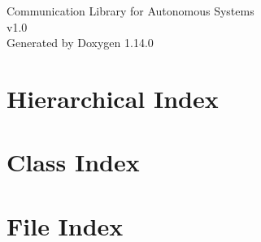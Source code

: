 \documentclass[twoside]{book}
\newcommand{\+}{\discretionary{\mbox{\scriptsize$\hookleftarrow$}}{}{}}
\newcommand{\clearemptydoublepage}{%
    \newpage{\pagestyle{empty}\cleardoublepage}%
  }
\begin{document}
  \raggedbottom
    \hypersetup{pageanchor=false,
                bookmarksnumbered=true,
                pdfencoding=unicode
               }
  \begin{titlepage}
  \vspace*{7cm}
  \begin{center}%
  {\Large Communication Library for Autonomous Systems}\\
  [1ex]\large v1.\+0 \\
  \vspace*{1cm}
  {\large Generated by Doxygen 1.14.0}\\
  \end{center}
  \end{titlepage}
  \clearemptydoublepage
  \tableofcontents
  \clearemptydoublepage
  \hypersetup{pageanchor=true}

\chapter{Hierarchical Index}

\chapter{Class Index}

\chapter{File Index}

\end{document}
